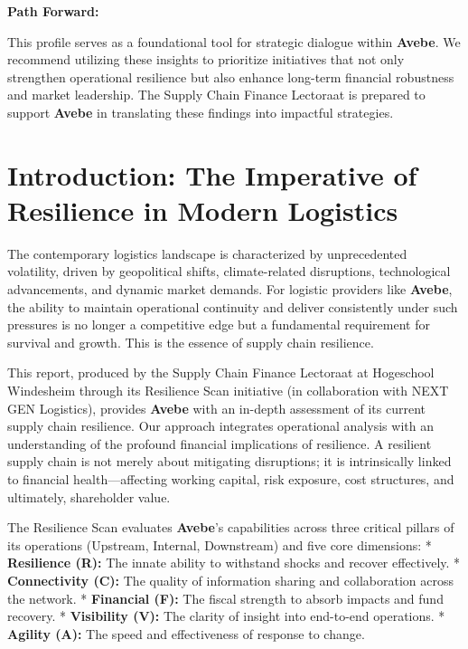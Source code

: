 \documentclass[
  oneside,
  open=any,
  fontsize=11pt]{scrbook}
\begin{document}
\textbf{Path Forward:}

This profile serves as a foundational tool for strategic dialogue within
\textbf{Avebe}. We recommend utilizing these insights to prioritize
initiatives that not only strengthen operational resilience but also
enhance long-term financial robustness and market leadership. The Supply
Chain Finance Lectoraat is prepared to support \textbf{Avebe} in
translating these findings into impactful strategies.

\newpage

\chapter{Introduction: The Imperative of Resilience in Modern
Logistics}\label{introduction-the-imperative-of-resilience-in-modern-logistics}

The contemporary logistics landscape is characterized by unprecedented
volatility, driven by geopolitical shifts, climate-related disruptions,
technological advancements, and dynamic market demands. For logistic
providers like \textbf{Avebe}, the ability to maintain operational
continuity and deliver consistently under such pressures is no longer a
competitive edge but a fundamental requirement for survival and growth.
This is the essence of supply chain resilience.

This report, produced by the Supply Chain Finance Lectoraat at
Hogeschool Windesheim through its Resilience Scan initiative (in
collaboration with NEXT GEN Logistics), provides \textbf{Avebe} with an
in-depth assessment of its current supply chain resilience. Our approach
integrates operational analysis with an understanding of the profound
financial implications of resilience. A resilient supply chain is not
merely about mitigating disruptions; it is intrinsically linked to
financial health---affecting working capital, risk exposure, cost
structures, and ultimately, shareholder value.

The Resilience Scan evaluates \textbf{Avebe}'s capabilities across three
critical pillars of its operations (Upstream, Internal, Downstream) and
five core dimensions: * \textbf{Resilience (R):} The innate ability to
withstand shocks and recover effectively. * \textbf{Connectivity (C):}
The quality of information sharing and collaboration across the network.
* \textbf{Financial (F):} The fiscal strength to absorb impacts and fund
recovery. * \textbf{Visibility (V):} The clarity of insight into
end-to-end operations. * \textbf{Agility (A):} The speed and
effectiveness of response to change.
\end{document}
